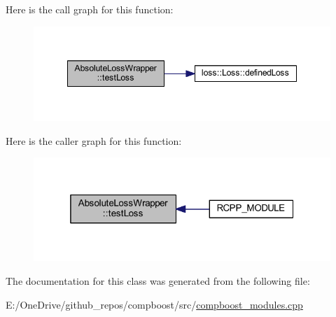 Here is the call graph for this function\+:\nopagebreak
\begin{figure}[H]
\begin{center}
\leavevmode
\includegraphics[width=348pt]{class_absolute_loss_wrapper_a85a76340b719fa2af7cc9964c7e668ed_cgraph}
\end{center}
\end{figure}
Here is the caller graph for this function\+:\nopagebreak
\begin{figure}[H]
\begin{center}
\leavevmode
\includegraphics[width=319pt]{class_absolute_loss_wrapper_a85a76340b719fa2af7cc9964c7e668ed_icgraph}
\end{center}
\end{figure}


The documentation for this class was generated from the following file\+:\begin{DoxyCompactItemize}
\item 
E\+:/\+One\+Drive/github\+\_\+repos/compboost/src/\mbox{\hyperlink{compboost__modules_8cpp}{compboost\+\_\+modules.\+cpp}}\end{DoxyCompactItemize}
